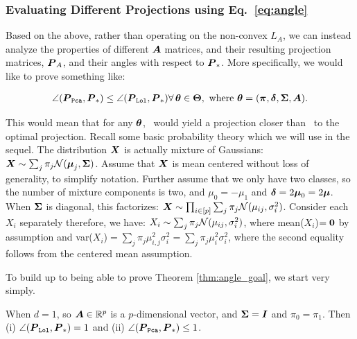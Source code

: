 \documentclass[10pt]{article}
\begin{document}





\subsubsection{Evaluating Different Projections using Eq.~\eqref{eq:angle}}




Based on the above, rather than operating on the non-convex $L_A$, we can instead analyze the properties of different $\boldsymbol{A}$ matrices, and their resulting projection matrices, $\boldsymbol{P}_A$, and their angles with respect to $\boldsymbol{P}_*$. More specifically, we would like to prove something like:
\begin{thm} \label{thm:angle_goal}
\begin{align} \label{eq:angle_goal}
\angle(\boldsymbol{P}_{{\sc \texttt{Pca}}},\boldsymbol{P}_*) \leq \angle(\boldsymbol{P}_{{\sc \texttt{Lol}}},\boldsymbol{P}_*) \forall \, \boldsymbol{\theta} \in \boldsymbol{\Theta}, \text{ where }\boldsymbol{\theta} = (\boldsymbol{\pi},\boldsymbol{\delta},\boldsymbol{\Sigma},\boldsymbol{A}).
\end{align}
 \end{thm}

This would mean that for any $\boldsymbol{\theta}$, \Lol~would yield a projection closer than \Pca~to the optimal projection.
Recall some basic probability theory which we will use in the sequel.
The distribution $\boldsymbol{X}$ is actually mixture of Gaussians:
$\boldsymbol{X} \sim \sum_j \pi_j \mathcal{N}(\boldsymbol{\mu}_j,\boldsymbol{\Sigma})$.  
Assume that $\boldsymbol{X}$ is mean centered without loss of generality, to simplify notation.
Further assume that we only have two classes, so the number of mixture components is two, and $\mu_0=-\mu_1$ and $\boldsymbol{\delta}=2 \boldsymbol{\mu}_0=2 \boldsymbol{\mu}$.
When $\boldsymbol{\Sigma}$ is diagonal, this factorizes: 
$\boldsymbol{X} \sim \prod_{i \in [p]} \sum_j \pi_j \mathcal{N}(\mu_{ij},\sigma_i^2)$. 
Consider each $X_i$ separately therefore, we have:
$X_i \sim \sum_j \pi_j \mathcal{N}(\mu_{ij},\sigma_i^2)$, where mean($X_i$)$=\boldsymbol{0}$ by assumption and
var($X_i$)$=\sum_j \pi_j \mu_{i,j}^2 \sigma_i^2=\sum_j \pi_j \mu_i^2 \sigma_i^2$,
where the second equality follows from the centered mean assumption. 


To build up to being able to prove Theorem \ref{thm:angle_goal}, we start very simply.
\begin{lem}
When $d=1$, so $\boldsymbol{A} \in \mathbb{R}^{p}$ is a $p$-dimensional vector, and $\boldsymbol{\Sigma}=\boldsymbol{I}$ and $\pi_0=\pi_1$.
Then (i) $\angle(\boldsymbol{P}_{{\sc \texttt{Lol}}},\boldsymbol{P}_*)=1$ and (ii) $\angle(\boldsymbol{P}_{{\sc \texttt{Pca}}},\boldsymbol{P}_*) \leq 1$.
\end{lem}
\end{document}
